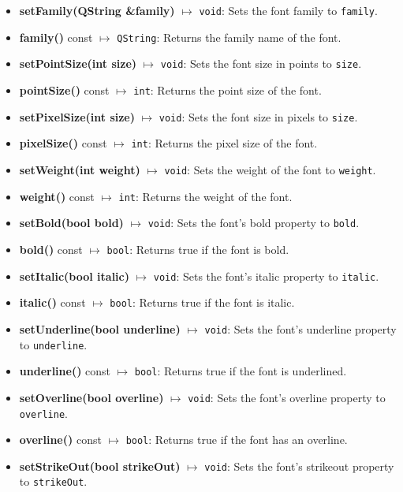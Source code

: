 \documentclass{report}
\begin{document}
    \pagebreak 
    \bigbreak \noindent 
    \begin{itemize}
        \item \textbf{setFamily(QString \&family)} $\mapsto$ \texttt{void}: Sets the font family to \texttt{family}.
        \item \textbf{family()} const $\mapsto$ \texttt{QString}: Returns the family name of the font.
        \item \textbf{setPointSize(int size)} $\mapsto$ \texttt{void}: Sets the font size in points to \texttt{size}.
        \item \textbf{pointSize()} const $\mapsto$ \texttt{int}: Returns the point size of the font.
        \item \textbf{setPixelSize(int size)} $\mapsto$ \texttt{void}: Sets the font size in pixels to \texttt{size}.
        \item \textbf{pixelSize()} const $\mapsto$ \texttt{int}: Returns the pixel size of the font.
        \item \textbf{setWeight(int weight)} $\mapsto$ \texttt{void}: Sets the weight of the font to \texttt{weight}.
        \item \textbf{weight()} const $\mapsto$ \texttt{int}: Returns the weight of the font.
        \item \textbf{setBold(bool bold)} $\mapsto$ \texttt{void}: Sets the font's bold property to \texttt{bold}.
        \item \textbf{bold()} const $\mapsto$ \texttt{bool}: Returns true if the font is bold.
        \item \textbf{setItalic(bool italic)} $\mapsto$ \texttt{void}: Sets the font's italic property to \texttt{italic}.
        \item \textbf{italic()} const $\mapsto$ \texttt{bool}: Returns true if the font is italic.
        \item \textbf{setUnderline(bool underline)} $\mapsto$ \texttt{void}: Sets the font's underline property to \texttt{underline}.
        \item \textbf{underline()} const $\mapsto$ \texttt{bool}: Returns true if the font is underlined.
        \item \textbf{setOverline(bool overline)} $\mapsto$ \texttt{void}: Sets the font's overline property to \texttt{overline}.
        \item \textbf{overline()} const $\mapsto$ \texttt{bool}: Returns true if the font has an overline.
        \item \textbf{setStrikeOut(bool strikeOut)} $\mapsto$ \texttt{void}: Sets the font's strikeout property to \texttt{strikeOut}.

\end{itemize}
\end{document}

